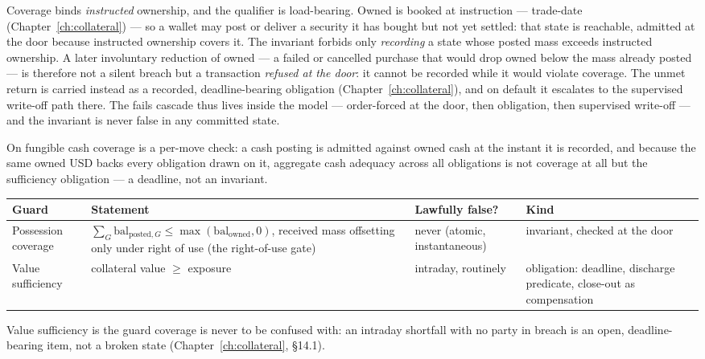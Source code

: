 \documentclass[11pt,a4paper]{article}
\begin{document}
Coverage binds \emph{instructed} ownership, and the qualifier is load-bearing. Owned is
booked at instruction --- trade-date (Chapter~\ref{ch:collateral}) --- so a wallet may
post or deliver a security it has bought but not yet settled: that state is reachable,
admitted at the door because instructed ownership covers it. The invariant forbids only
\emph{recording} a state whose posted mass exceeds instructed ownership. A later
involuntary reduction of owned --- a failed or cancelled purchase that would drop owned
below the mass already posted --- is therefore not a silent breach but a transaction
\emph{refused at the door}: it cannot be recorded while it would violate coverage. The
unmet return is carried instead as a recorded, deadline-bearing obligation
(Chapter~\ref{ch:collateral}), and on default it escalates to the supervised write-off
path there. The fails cascade thus lives inside the model --- order-forced at the door,
then obligation, then supervised write-off --- and the invariant is never false in any
committed state.

On fungible cash coverage is a per-move check: a cash posting is admitted against owned
cash at the instant it is recorded, and because the same owned USD backs every
obligation drawn on it, aggregate cash adequacy across all obligations is not coverage
at all but the sufficiency obligation --- a deadline, not an invariant.

\begin{center}
\begin{tabular}{@{}p{}p{}p{}p{}@{}}
\toprule
Guard & Statement & Lawfully false? & Kind \\
\midrule
Possession coverage & $\sum_G \mathrm{bal}_{\mathrm{posted},G} \le \max(\mathrm{bal}_{\mathrm{owned}},0)$, received mass offsetting only under right of use (the right-of-use gate) & never (atomic, instantaneous) & invariant, checked at the door \\
Value sufficiency & collateral value $\ge$ exposure & intraday, routinely & obligation: deadline, discharge predicate, close-out as compensation \\
\bottomrule
\end{tabular}
\end{center}

\noindent Value sufficiency is the guard coverage is never to be confused with: an intraday
shortfall with no party in breach is an open, deadline-bearing item, not a broken state
(Chapter~\ref{ch:collateral}, \S 14.1).
\end{document}
